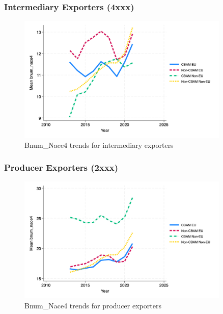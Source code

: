 \documentclass{article}
\begin{document}
\subsubsection{Intermediary Exporters (4xxx)}
\begin{figure}[h!]
\centering
\includegraphics[width=0.9\textwidth]{bnum_nace4_ei.png}
\caption{Bnum_Nace4 trends for intermediary exporters}
\label{fig:bnum_nace4_ei}
\end{figure}

\subsubsection{Producer Exporters (2xxx)}
\begin{figure}[h!]
\centering
\includegraphics[width=0.9\textwidth]{bnum_nace4_ep.png}
\caption{Bnum_Nace4 trends for producer exporters}
\label{fig:bnum_nace4_ep}
\end{figure}
\end{document}
